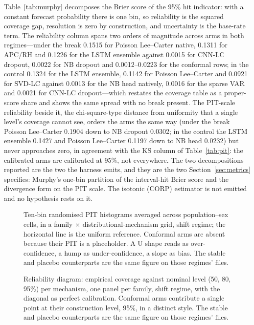 Table~\ref{tab:murphy} decomposes the Brier score of the 95\% hit
indicator: with a constant forecast probability there is one bin, so
reliability is the squared coverage gap, resolution is zero by
construction, and uncertainty is the base-rate term. The reliability
column spans two orders of magnitude across arms in both regimes---under
the break 0.1515 for Poisson Lee--Carter native, 0.1311 for APC/RH and
0.1226 for the LSTM ensemble against 0.0015 for CNN-LC dropout, 0.0022 for
NB dropout and 0.0012--0.0223 for the conformal rows; in the control
0.1324 for the LSTM ensemble, 0.1142 for Poisson Lee--Carter and 0.0921
for SVD-LC against 0.0013 for the NB head natively, 0.0016 for the sparse
VAR and 0.0021 for CNN-LC dropout---which restates the coverage table as a
proper-score share and shows the same spread with no break present. The
PIT-scale reliability beside it, the chi-square-type distance from
uniformity that a single level's coverage cannot see, orders the arms the
same way (under the break Poisson Lee--Carter 0.1904 down to NB dropout
0.0302; in the control the LSTM ensemble 0.1427 and Poisson Lee--Carter
0.1197 down to NB head 0.0232) but never approaches zero, in agreement
with the KS column of Table~\ref{tab:pit}: the calibrated arms are
calibrated at 95\%, not everywhere. The two decompositions reported are
the two the harness emits, and they are the two Section~\ref{sec:metrics}
specifies: Murphy's one-bin partition of the interval-hit Brier score and
the divergence form on the PIT scale. The isotonic (CORP) estimator is not
emitted and no hypothesis rests on it.

\begin{figure}[htbp]\centering
{}
\caption{Ten-bin randomised PIT histograms averaged across population--sex
cells, in a family $\times$ distributional-mechanism grid, shift regime;
the horizontal line is the uniform reference. Conformal arms are absent
because their PIT is a placeholder. A U shape reads as over-confidence, a
hump as under-confidence, a slope as bias. The stable and placebo
counterparts are the same figure on those regimes' files.}
\label{fig:pit-hist}
\end{figure}

\begin{figure}[htbp]\centering
{}
\caption{Reliability diagram: empirical coverage against nominal level
(50, 80, 95\%) per mechanism, one panel per family, shift regime, with
the diagonal as perfect calibration. Conformal arms contribute a single
point at their construction level, 95\%, in a distinct style. The stable
and placebo counterparts are the same figure on those regimes' files.}
\label{fig:reliability}
\end{figure}


